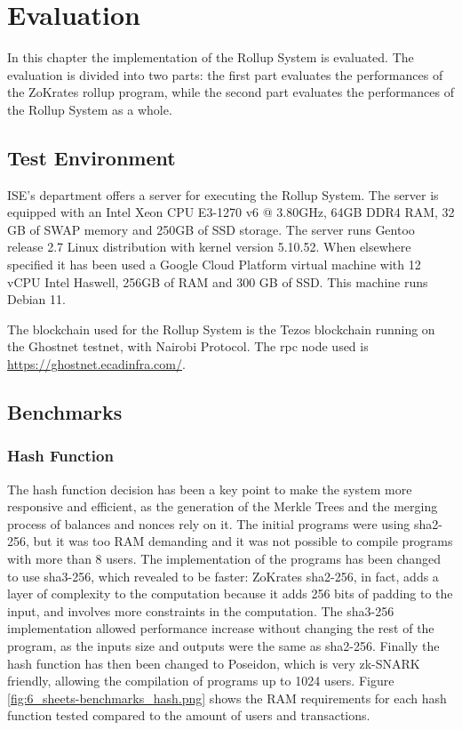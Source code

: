 \chapter{Evaluation\label{cha:chapter6}}

In this chapter the implementation of the Rollup System is evaluated. The evaluation is divided into two parts: the first part evaluates the performances of the ZoKrates rollup program, while the second part evaluates the performances of the Rollup System as a whole.



\section{Test Environment\label{sec:testenvir}}

ISE's department offers a server for executing the Rollup System. The server is equipped with an Intel Xeon CPU E3-1270 v6 @ 3.80GHz, 64GB DDR4 RAM, 32 GB of SWAP memory and 250GB of SSD storage. The server runs Gentoo release 2.7 Linux distribution with kernel version 5.10.52. When elsewhere specified it has been used a Google Cloud Platform virtual machine with 12 vCPU Intel Haswell, 256GB of RAM and 300 GB of SSD. This machine runs Debian 11.

The blockchain used for the Rollup System is the Tezos blockchain running on the Ghostnet testnet, with Nairobi Protocol. The rpc node used is \url{https://ghostnet.ecadinfra.com/}.


\section{Benchmarks\label{sec:benchmarks}}

\subsection{Hash Function\label{subsec:6_hashfunc}}

The hash function decision has been a key point to make the system more responsive and efficient, as the generation of the Merkle Trees and the merging process of balances and nonces rely on it. The initial programs were using sha2-256, but it was too RAM demanding and it was not possible to compile programs with more than 8 users. The implementation of the programs has been changed to use sha3-256, which revealed to be faster: ZoKrates sha2-256, in fact, adds a layer of complexity to the computation because it adds 256 bits of padding to the input, and involves more constraints in the computation. The sha3-256 implementation allowed performance increase without changing the rest of the program, as the inputs size and outputs were the same as sha2-256.
Finally the hash function has then been changed to Poseidon, which is very zk-SNARK friendly, allowing the compilation of programs up to 1024 users. Figure \ref{fig:6_sheets-benchmarks_hash.png} shows the RAM requirements for each hash function tested compared to the amount of users and transactions.


